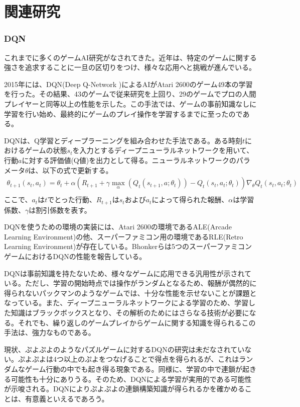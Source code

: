 \documentclass[12pt]{jsarticle}
\begin{document}
\part{関連研究} \setcounter{section}{0}
\section{DQN}
これまでに多くのゲームAI研究がなされてきた。近年は、特定のゲームに関する強さを追求することに一旦の区切りをつけ、様々な応用へと挑戦が進んでいる\cite{yan_panorama, adaptive}。

2015年には、DQN(Deep Q-Network )によるAIがAtari 2600のゲーム49本の学習を行った\cite{DQN}。その結果、43のゲームで従来研究を上回り、29のゲームでプロの人間プレイヤーと同等以上の性能を示した。この手法では、ゲームの事前知識なしに学習を行い始め、最終的にゲームのプレイ操作を学習するまでに至ったのである。

DQNは、Q学習とディープラーニングを組み合わせた手法である。ある時刻$t$におけるゲームの状態$s_t$を入力とするディープニューラルネットワークを用いて、行動$a$に対する評価値(Q値)を出力として得る。ニューラルネットワークのパラメータ$\theta$は、以下の式で更新する。
\begin{eqnarray}
\theta_{t+1}(s_t, a_t) = \theta_t + \alpha (R_{t+1} + \gamma \max_\alpha(Q_t(s_{t+1}, a; \theta_t)) - Q_t(s_t, a_t; \theta_t))\nabla_\theta Q_t(s_t, a_t; \theta_t) \nonumber\\
\end{eqnarray}
ここで、$a_t$は$t$でとった行動、$R_{t+1}$は$s_t$および$a_t$によって得られた報酬、$\alpha$は学習係数、$\gamma$は割引係数を表す。

DQNを使うための環境の実装には、Atari 2600の環境であるALE(Arcade Learning Environment)\cite{ALE}の他、スーパーファミコン用の環境であるRLE(Retro Learning Environment)\cite{RLE}が存在している。Bhonkerらは5つのスーパーファミコンゲームにおけるDQNの性能を報告している\cite{RLE}。

DQNは事前知識を持たないため、様々なゲームに応用できる汎用性が示されている。ただし、学習の開始時点では操作がランダムとなるため、報酬が偶然的に得られないパックマンのようなゲームでは、十分な性能を示せないことが課題となっている。また、ディープニューラルネットワークによる学習のため、学習した知識はブラックボックスとなり、その解析のためにはさらなる技術が必要になる。それでも、繰り返しのゲームプレイからゲームに関する知識を得られるこの手法は、強力なものである。

現状、ぷよぷよのようなパズルゲームに対するDQNの研究は未だなされていない。ぷよぷよは4つ以上のぷよをつなげることで得点を得られるが、これはランダムなゲーム行動の中でも起き得る現象である。同様に、学習の中で連鎖が起きる可能性も十分にありうる。そのため、DQNによる学習が実用的である可能性が示唆される。DQNによりぷよぷよの連鎖構築知識が得られるかを確かめることは、有意義といえるであろう。
\end{document}
